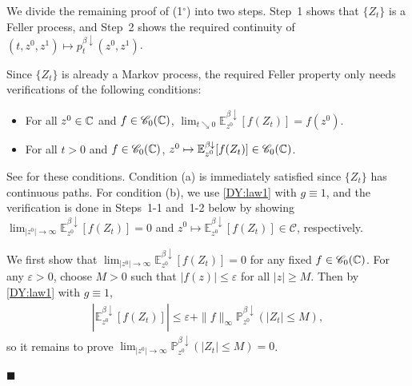 \documentclass[12pt, twoside]{article}
\numberwithin{figure}{section}
\newcommand{\1}{\mathds 1}
\newcommand{\C}{{\mathscr C}}
\newcommand{\vep}{{\varepsilon}}
\newcommand{\da}{{\downarrow}}
\renewcommand{\P}{{\mathbb P}}
\newcommand{\E}{{\mathbb E}}
\newcommand{\2}{{\mathbf 1}}
\renewenvironment{proof}[1][\proofname]{\noindent {\bfseries #1.}\;}{\hfill\ensuremath{\blacksquare}\\}
\newcommand{\cc}{{^\circ}}
\begin{document}
\begin{proof}[Proof of Theorem~\ref{thm:formulas}]
We divide the remaining proof of (1$\cc$) into two steps. Step~1 shows that $\{Z_t\}$ is a Feller process, and Step~2 shows the required continuity of $(t,z^0,z^1)\mapsto p_t^{\beta\da}(z^0,z^1)$. \smallskip 

Since $\{Z_t\}$ is already a Markov process, the required Feller property only needs verifications of the following conditions: 
\begin{itemize}
\item [(a)] For all $z^0\in \Bbb C$ and $f\in \C_0(\Bbb C)$, $\lim_{t\searrow 0}\E^{\beta\da}_{z^0}[f(Z_t)]=f(z^0)$.
\item [(b)] For all $t>0$ and $f\in \C_0(\Bbb C)$, $z^0\mapsto \E^{\beta\da }_{z^0}[f(Z_t)]\in \C_0(\Bbb C)$.
\end{itemize}
See \cite[(2.4) Proposition, p.89]{RY} for these conditions. Condition (a) is immediately satisfied since $\{Z_t\}$ has continuous paths. For condition (b), we use \eqref{DY:law1} with $g\equiv 1$, and the verification is done in Steps~1-1 and~1-2 below by showing $\lim_{|z^0|\to\infty}\E^{\beta\da }_{z^0}[f(Z_t)]=0$ and $z^0\mapsto \E^{\beta\da }_{z^0}[f(Z_t)]\in \C$, respectively. 
\smallskip 

We first show that $\lim_{|z^0|\to\infty}\E^{\beta\da }_{z^0}[f(Z_t)]=0$ for any fixed $f\in \C_0(\Bbb C)$. For any $\vep>0$, choose $M>0$ such that $|f(z)|\leq \vep$ for all $|z|\geq M$. Then by \eqref{DY:law1} with $g\equiv 1$,
\begin{align}\label{Feller:3-0}
|\E^{\beta\da}_{z^0}[f(Z_t)]|\leq \vep+\|f\|_\infty\P^{\beta\da}_{z^0}(|Z_t|\leq M),
\end{align}
so it remains to prove $\lim_{|z^0|\to\infty}\P^{\beta\da}_{z^0}(|Z_t|\leq M)=0$. 


\end{proof}
\end{document}

